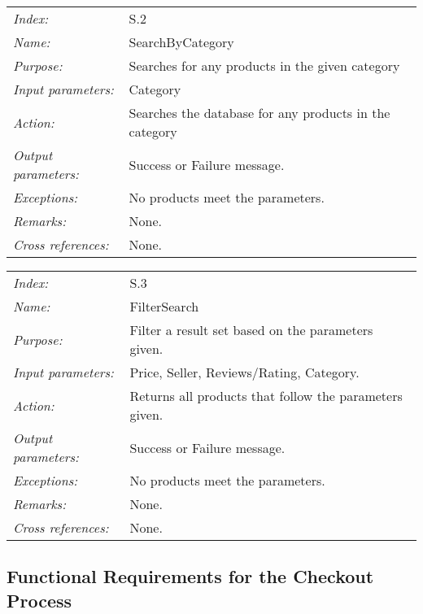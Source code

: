 \documentclass[10pt,letter]{article}
\begin{document}
\begin{tabularx}{\textwidth}{l X}
    \it{Index:} & S.2 \\
    \it{Name:} & SearchByCategory \\
    \it{Purpose:} & Searches for any products in the given category\\
    \it{Input parameters:} & Category\\
    \it{Action:} & Searches the database for any products in the category\\
    \it{Output parameters:} & Success or Failure message. \\
    \it{Exceptions:} & No products meet the parameters. \\
    \it{Remarks:} & None. \\
    \it{Cross references:} & None. \\
    \hline
\end{tabularx}

\begin{tabularx}{\textwidth}{l X}
    \it{Index:} & S.3 \\
    \it{Name:} & FilterSearch \\
    \it{Purpose:} & Filter a result set based on the parameters given.\\
    \it{Input parameters:} & Price, Seller, Reviews/Rating, Category.\\
    \it{Action:} & Returns all products that follow the parameters given.\\
    \it{Output parameters:} & Success or Failure message. \\
    \it{Exceptions:} & No products meet the parameters. \\
    \it{Remarks:} & None. \\
    \it{Cross references:} & None. \\
    \hline
\end{tabularx}

\subsection{Functional Requirements for the Checkout Process}
\end{document}
